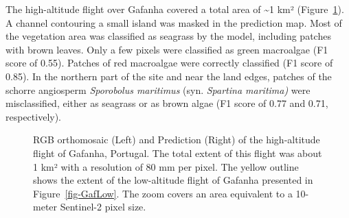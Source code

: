 \documentclass[
  number]{elsarticle}
\begin{document}
The high-altitude flight over Gafanha covered a total area of
\textasciitilde1 km² (Figure~\ref{fig-GafHigh}). A channel contouring a
small island was masked in the prediction map. Most of the vegetation
area was classified as seagrass by the model, including patches with
brown leaves. Only a few pixels were classified as green macroalgae (F1
score of 0.55). Patches of red macroalgae were correctly classified (F1
score of 0.85). In the northern part of the site and near the land
edges, patches of the schorre angiosperm \emph{Sporobolus maritimus}
(syn. \emph{Spartina maritima)} were misclassified, either as seagrass
or as brown algae (F1 score of 0.77 and 0.71, respectively).

\label{cell-fig-GafHigh}
\begin{figure}[H]


\caption{\label{fig-GafHigh}RGB orthomosaic (Left) and Prediction
(Right) of the high-altitude flight of Gafanha, Portugal. The total
extent of this flight was about 1 km² with a resolution of 80 mm per
pixel. The yellow outline shows the extent of the low-altitude flight of
Gafanha presented in Figure~\ref{fig-GafLow}. The zoom covers an area
equivalent to a 10-meter Sentinel-2 pixel size.}

\end{figure}%
\end{document}

